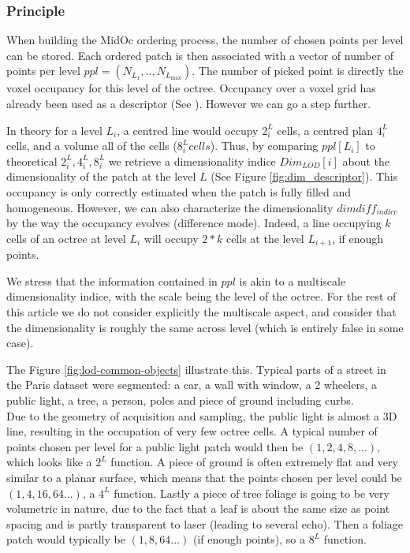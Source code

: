		\subsubsection{Principle}
		When building the MidOc ordering process, the number of chosen points per level can be stored.
		Each ordered patch is then associated with a vector of number of points per level $ppl=(N_{L_{1}},..,N_{L_{\text{max}}})$.
		The number of picked point is directly the voxel occupancy for this level of the octree.
		Occupancy over a voxel grid has already been used as a descriptor (See \cite{Bustos2005}).
		However we can go a step further.
		
		In theory for a level $L_i$, a centred line would occupy $2^L_i$ cells, a centred plan $4^L_i$ cells, and a volume all of the cells ($8^L_i cells$).
		Thus, by comparing $ppl[L_i]$ to theoretical $2^L_i, 4^L_i, 8^L_i$ we retrieve a dimensionality indice  $Dim_{LOD}[i]$  about the dimensionality of the patch at the level $L$ (See Figure \ref{fig:dim_descriptor}). 
		This occupancy is only correctly estimated when the patch is fully filled and homogeneous. 
		However, we can also characterize the dimensionality $dimdiff_{indice}$ by the way the occupancy evolves (difference mode).
		Indeed, a line occupying $k$ cells of an octree at level $L_i$ will occupy $2*k$ cells at the level $L_{i+1}$, if enough points.
		
		We stress that the information contained in $ppl$ is akin to a multiscale dimensionality indice,
		with the scale being the level of the octree.
		For the rest of this article we do not consider explicitly the multiscale aspect,
		 and consider that the dimensionality is roughly the same across level 
		 (which is entirely false in some case).
		
		The Figure \ref{fig:lod-common-objects} illustrate this. Typical parts of a street in the Paris dataset were segmented: a car, a wall with window, a 2 wheelers, a public light, a tree, a person, poles and piece of ground including curbs.
		\\
		Due to the geometry of acquisition and sampling, the public light is almost a 3D line, resulting in the occupation of very few octree cells.
		A typical number of points chosen per level for a public light patch would then be $(1,2,4,8,...)$, which looks like a $2^L$ function.
		A piece of ground is often extremely flat and very similar to a planar surface,
		which means that the points chosen per level could be $(1,4,16,64...)$, a $4^L$ function.
		Lastly a piece of tree foliage is going to be very volumetric in nature,
		due to the fact that a leaf is about the same size as point spacing and is partly transparent to laser (leading to several echo).
		Then a foliage patch would typically be $(1,8,64...)$ (if enough points), so a $8^L$ function.
		 
